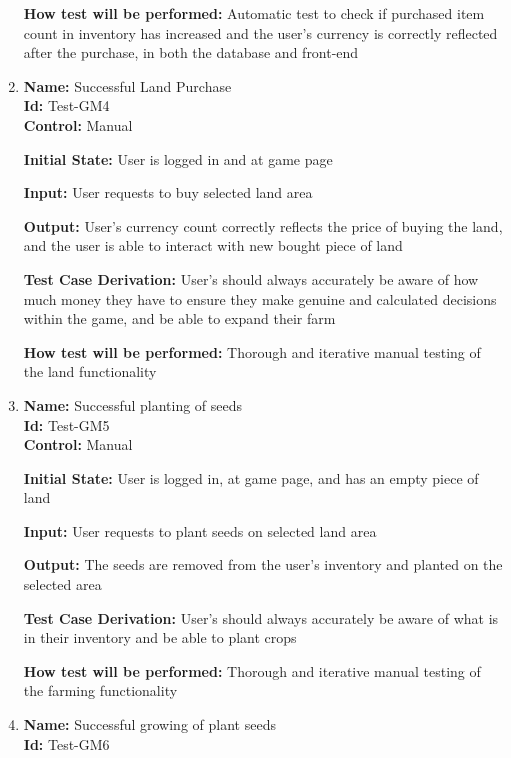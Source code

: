 \documentclass[12pt, titlepage]{article}
\begin{document}
\begin{enumerate}
\textbf{How test will be performed:} Automatic test to check if purchased item count in inventory has increased and the user’s currency is correctly reflected after the purchase, in both the database and front-end

\item{\textbf{Name:} Successful Land Purchase\\} %
\textbf{Id:} Test-GM4 \label{Test-GM4}\\

\textbf{Control:} Manual
					
\textbf{Initial State:} User is logged in and at game page
					
\textbf{Input:} User requests to buy selected land area
					
\textbf{Output:} User's currency count correctly reflects the price of buying the land, and the user is able to interact with new bought piece of land

\textbf{Test Case Derivation:} User's should always accurately be aware of how much money they have to ensure they make genuine and calculated decisions within the game, and be able to expand their farm

\textbf{How test will be performed:} Thorough and iterative manual testing of the land functionality

\item{\textbf{Name:} Successful planting of seeds\\} %
\textbf{Id:} Test-GM5 \label{Test-GM5}\\

\textbf{Control:} Manual
					
\textbf{Initial State:} User is logged in, at game page, and has an empty piece of land
					
\textbf{Input: }User requests to plant seeds on selected land area
					
\textbf{Output:} The seeds are removed from the user's inventory and planted on the selected area

\textbf{Test Case Derivation:} User's should always accurately be aware of what is in their inventory and be able to plant crops

\textbf{How test will be performed: }Thorough and iterative manual testing of the farming functionality

\item{\textbf{Name:} Successful growing of plant seeds\\} %
\textbf{Id:} Test-GM6 \label{Test-GM6}\\


\end{enumerate}
\end{document}
